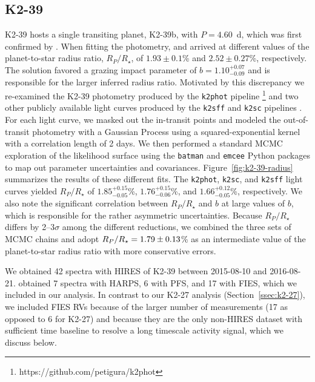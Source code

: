 \documentclass[preprint2]{aastex6}
\newcommand{\Rstar}{\ensuremath{R_{\star}}\xspace}
\newcommand{\Rp}{\ensuremath{R_P}\xspace}
\newcommand{\rrat}{\ensuremath{\Rp/\Rstar}\xspace}
\begin{document}
\subsection{K2-39}
\label{ssec:k2-39}
K2-39 hosts a single transiting planet, K2-39b, with $P = 4.60$~d, which was first confirmed by \cite{VanEylen16b}. When fitting the photometry, \cite{VanEylen16b} and \cite{Crossfield16} arrived at different values of the planet-to-star radius ratio, $\Rp/\Rstar$, of $1.93 \pm 0.1$\% and $2.52 \pm 0.27$\%, respectively. The \cite{Crossfield16} solution favored a grazing impact parameter of $b = 1.10^{+0.07}_{-0.09}$ and is responsible for the larger inferred radius ratio. Motivated by this discrepancy we re-examined the K2-39 photometry produced by the {\tt k2phot} pipeline%
%
\footnote{https://github.com/petigura/k2phot}
%
and two other publicly available light curves produced by the {\tt k2sff} and {\tt k2sc} pipelines \citep{Vanderburg14,Aigrain15}. For each light curve, we masked out the in-transit points and modeled the out-of-transit photometry with a Gaussian Process \citep{Rasmussen05} using a squared-exponential kernel with a correlation length of 2 days. We then performed a standard MCMC exploration of the likelihood surface using the {\tt batman} \citep{Kreidberg15} and {\tt emcee} Python packages to map out parameter uncertainties and covariances. Figure~\ref{fig:k2-39-radius} summarizes the results of these different fits. The {\tt k2phot}, {\tt k2sc}, and {\tt k2sff} light curves yielded $\Rp/\Rstar$ of  $1.85_{-0.05}^{+0.15}$\%, $1.76_{-0.06}^{+0.15}$\%, and $1.66_{-0.05}^{+0.12}$\%, respectively. We also note the significant correlation between $\Rp/\Rstar$ and $b$ at large values of $b$, which is responsible for the rather asymmetric uncertainties. Because $\Rp/\Rstar$ differs by 2--3$\sigma$ among the different reductions, we combined the three sets of MCMC chains and adopt $\rrat = \val{K2-39-circ}{rrat1}$\% as an intermediate value of the planet-to-star radius ratio with more conservative errors.

We obtained 42 spectra with HIRES of K2-39 between 2015-08-10 and 2016-08-21. \cite{VanEylen16b} obtained 7 spectra with HARPS, 6 with PFS, and 17 with FIES, which we included in our analysis. In contrast to our K2-27 analysis (Section~\ref{ssec:k2-27}), we included FIES RVs because of the larger number of measurements (17 as opposed to 6 for K2-27) and because they are the only non-HIRES dataset with sufficient time baseline to resolve a long timescale activity signal, which we discuss below.
\end{document}
